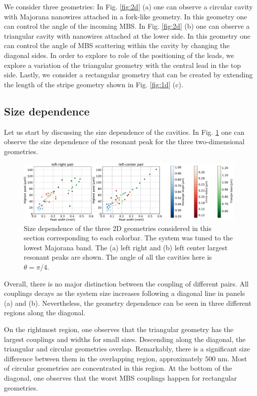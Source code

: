 We consider three geometries:
In Fig. \ref{fig:2d} (a) one can observe a circular cavity with Majorana nanowires attached in a fork-like geometry.
In this geometry one can control the angle of the incoming MBS.
In Fig. \ref{fig:2d} (b) one can observe a triangular cavity with nanowires attached at the lower side.
In this geometry one can control the angle of MBS scattering within the cavity by changing the diagonal sides.
In order to explore to role of the positioning of the leads, we explore a variation of the triangular geometry with the central lead in the top side.
Lastly, we consider a rectangular geometry that can be created by extending the length of the stripe geometry shown in Fig. \ref{fig:1d} (c).

\subsection{Size dependence}

Let us start by discussing the size dependence of the cavities.
In Fig. \ref{fig:2d_size_results} one can observe the size dependence of the resonant peak for the three two-dimensional geometries.

\begin{figure}[h!]
\centering
  \includegraphics[width=\linewidth]{figures/couplings_2d.pdf}
  \caption{Size dependence of the three 2D geometries considered in this section corresponding to each colorbar. The system was tuned to the lowest Majorana band. The (a) left right and (b) left center largest resonant peaks are shown. The angle of all the cavities here is $\theta=\pi/4$.}
  \label{fig:2d_size_results}
\end{figure}

Overall, there is no major distinction between the coupling of different pairs.
All couplings decays as the system size increases following a diagonal line in panels (a) and (b).
Nevertheless, the geometry dependence can be seen in three different regions along the diagonal.

On the rightmost region, one observes that the triangular geometry has the largest couplings and widths for small sizes.
Descending along the diagonal, the triangular and circular geometries overlap.
Remarkably, there is a significant size difference between them in the overlapping region, approximately $500$ nm.
Most of circular geometries are concentrated in this region.
At the bottom of the diagonal, one observes that the worst MBS couplings happen for rectangular geometries.


